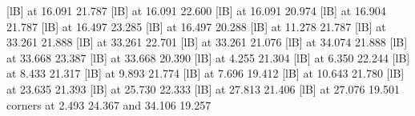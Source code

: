{{} [lB] at 16.091 21.787
%
%
 [lB] at 16.091 22.600
%
%
 [lB] at 16.091 20.974
%
%
 [lB] at 16.904 21.787
%
%
 [lB] at 16.497 23.285
%
%
 [lB] at 16.497 20.288
%
%
 [lB] at 11.278 21.787
%
%
 [lB] at 33.261 21.888
%
%
 [lB] at 33.261 22.701
%
%
 [lB] at 33.261 21.076
%
%
 [lB] at 34.074 21.888
%
%
 [lB] at 33.668 23.387
%
%
 [lB] at 33.668 20.390
%
%
 [lB] at  4.255 21.304
%
%
 [lB] at  6.350 22.244
%
%
 [lB] at  8.433 21.317
%
%
 [lB] at  9.893 21.774
%
%
 [lB] at  7.696 19.412
%
%
 [lB] at 10.643 21.780
%
%
 [lB] at 23.635 21.393
%
%
 [lB] at 25.730 22.333
%
%
 [lB] at 27.813 21.406
%
%
 [lB] at 27.076 19.501
\linethickness=0pt
\putrectangle corners at  2.493 24.367 and 34.106 19.257
\endpicture}
